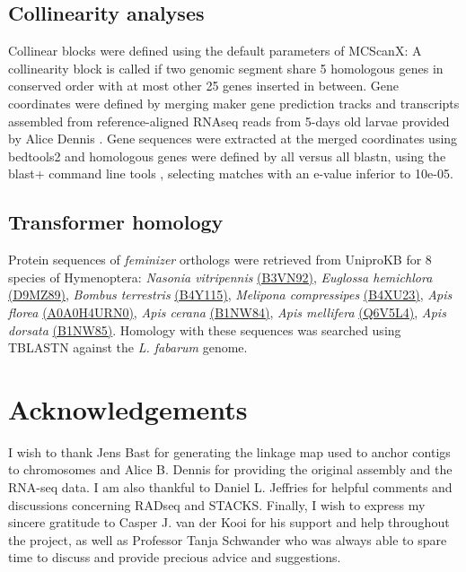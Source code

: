 \documentclass[11pt,a4paper]{report}
\begin{document}
\subsection{Collinearity analyses}
Collinear blocks were defined using the default parameters of MCScanX: A collinearity block is called if two genomic segment share 5 homologous genes in conserved order with at most other 25 genes inserted in between. Gene coordinates were defined by merging maker gene prediction tracks and transcripts assembled from reference-aligned RNAseq reads from 5-days old larvae provided by Alice Dennis \citep{Dennis2017ParasitoidHosts}. Gene sequences were extracted at the merged coordinates using bedtools2 \citep{Quinlan2010BEDTools:Features} and homologous genes were defined by all versus all blastn, using the blast+ command line tools \citep{Camacho2009BLAST+:Applications}, selecting matches with an e-value inferior to 10e-05.

\subsection{Transformer homology}
Protein sequences of \textit{feminizer} orthologs were retrieved from UniproKB for 8 species of Hymenoptera: \textit{Nasonia vitripennis} \href{http://www.uniprot.org/uniprot/B3VN92}{(B3VN92)}, \textit{Euglossa hemichlora} \href{http://www.uniprot.org/uniprot/D9MZ89/}{(D9MZ89)}, \textit{Bombus terrestris} \href{http://www.uniprot.org/uniprot/B4Y115}{(B4Y115)}, \textit{Melipona compressipes} \href{http://www.uniprot.org/uniprot/B4XU23}{(B4XU23)}, \textit{Apis florea} \href{whttp://ww.uniprot.org/uniprot/A0A0H4URN0}{(A0A0H4URN0)}, \textit{Apis cerana} \href{http://www.uniprot.org/uniprot/B1NW84}{(B1NW84)}, \textit{Apis mellifera} \href{http://www.uniprot.org/uniprot/Q6V5L4}{(Q6V5L4)}, \textit{Apis dorsata} \href{http://www.uniprot.org/uniprot/B1NW85}{(B1NW85)}. Homology with these sequences was searched using TBLASTN against the \textit{L. fabarum} genome.

\section{Acknowledgements}
I wish to thank Jens Bast for generating the linkage map used to anchor contigs to chromosomes and Alice B. Dennis for providing the original assembly and the RNA-seq data. I am also thankful to Daniel L. Jeffries for helpful comments and discussions concerning RADseq and STACKS. Finally, I wish to express my sincere gratitude to Casper J. van der Kooi for his support and help throughout the project, as well as Professor Tanja Schwander who was always able to spare time to discuss and provide precious advice and suggestions.
\end{document}
